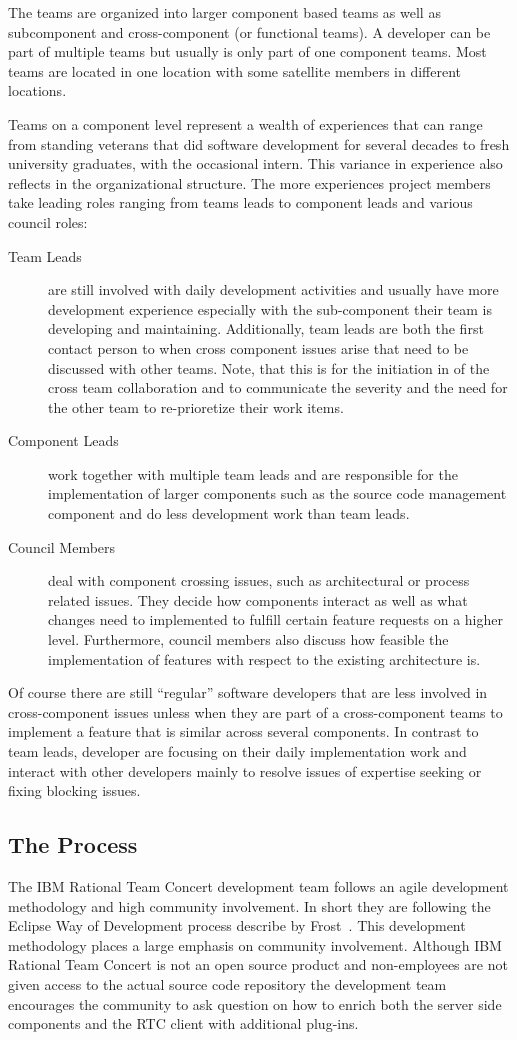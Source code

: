 The teams are organized into larger component based teams as well as subcomponent and cross-component (or functional teams).
A developer can be part of multiple teams but usually is only part of one component teams.
Most teams are located in one location with some satellite members in different locations.

Teams on a component level represent a wealth of experiences that can range from standing veterans that did software development for several decades to fresh university graduates, with the occasional intern.
This variance in experience also reflects in the organizational structure.
The more experiences project members take leading roles ranging from teams leads to component leads and various council roles:
\begin{description}
\item[Team Leads] are still involved with daily development activities and usually have more development experience especially with the sub-component their team is developing and maintaining.
Additionally, team leads are both the first contact person to when cross component issues arise that need to be discussed with other teams.
Note, that this is for the initiation in of the cross team collaboration and to communicate the severity and the need for the other team to re-prioretize their work items.
\item[Component Leads] work together with multiple team leads and are responsible for the implementation of larger components such as the source code management component and do less development work than team leads.
\item[Council Members] deal with component crossing issues, such as architectural or process related issues.
They decide how components interact as well as what changes need to implemented to fulfill certain feature requests on a higher level.
Furthermore, council members also discuss how feasible the implementation of features with respect to the existing architecture is.
\end{description}
Of course there are still ``regular'' software developers that are less involved in cross-component issues unless when they are part of a cross-component teams to implement a feature that is similar across several components.
In contrast to team leads, developer are focusing on their daily implementation work and interact with other developers mainly to resolve issues of expertise seeking or fixing blocking issues.

\subsection{The Process}
The IBM Rational Team Concert development team follows an agile development methodology and high community involvement.
In short they are following the Eclipse Way of Development process describe by Frost~\cite{frost:ieeesoftware:2007}.
This development methodology places a large emphasis on community involvement.
Although IBM Rational Team Concert is not an open source product and non-employees are not given access to the actual source code repository the development team encourages the community to ask question on how to enrich both the server side components and the RTC client with additional plug-ins.

